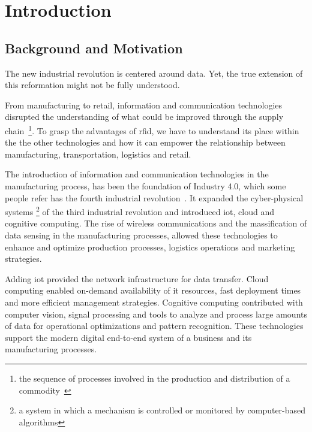 
\chapter{Introduction}

\section{Background and Motivation}

The new industrial revolution is centered around data. Yet, the true extension of this reformation might not be fully understood.

From manufacturing to retail, information and communication technologies disrupted the understanding of what could be improved through the supply chain~\footnote{the sequence of processes involved in the production and distribution of a commodity~\cite{OxfordLanguagesGoogle}}. 
To grasp the advantages of \ac{rfid}, we have to understand its place within the the other technologies and how it can empower the relationship between manufacturing, transportation, logistics and retail.

The introduction of information and communication technologies in the manufacturing process, has been the foundation of Industry 4.0, which some people refer has the fourth industrial revolution~\cite{marrWhatIndustryHere}. It expanded the cyber-physical systems \footnote{a system in which a mechanism is controlled or monitored by computer-based algorithms} of the third industrial revolution and introduced \ac{iot}, cloud and cognitive computing.
The rise of wireless communications and the massification of data sensing in the manufacturing processes, allowed these technologies to enhance and optimize production processes, logistics operations and marketing strategies.

Adding \ac{iot} provided the network infrastructure for data transfer. Cloud computing enabled on-demand availability of \ac{it} resources, fast deployment times and more efficient management strategies. Cognitive computing contributed with computer vision, signal processing and tools to analyze and process large amounts of data for operational optimizations and pattern recognition.
These technologies support the modern digital end-to-end system of a business and its manufacturing processes.

